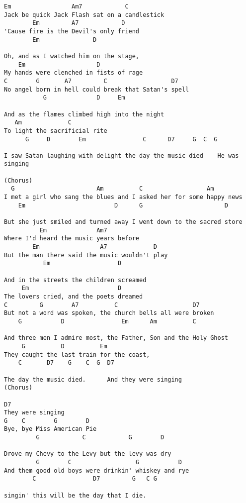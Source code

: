 \begin{verbatim}
Em                 Am7            C 
Jack be quick Jack Flash sat on a candlestick  
        Em         A7            D 
'Cause fire is the Devil's only friend 
        Em               D 

Oh, and as I watched him on the stage,  
    Em                    D 
My hands were clenched in fists of rage 
C        G       A7         C                  D7 
No angel born in hell could break that Satan's spell 
           G              D     Em 

And as the flames climbed high into the night  
   Am             C 
To light the sacrificial rite 
      G     D        Em                C      D7     G  C  G 

I saw Satan laughing with delight the day the music died    He was singing 

(Chorus) 
  G                       Am          C                  Am 
I met a girl who sang the blues and I asked her for some happy news 
    Em                         D      G                       D 

But she just smiled and turned away I went down to the sacred store 
          Em              Am7 
Where I'd heard the music years before  
        Em                 A7             D 
But the man there said the music wouldn't play 
           Em                   D 

And in the streets the children screamed  
     Em                         D 
The lovers cried, and the poets dreamed 
C         G        A7          C                     D7 
But not a word was spoken, the church bells all were broken 
    G           D                Em      Am          C 

And three men I admire most, the Father, Son and the Holy Ghost 
     G          D          Em 
They caught the last train for the coast, 
    C       D7    G    C  G  D7 

The day the music died.      And they were singing 
(Chorus) 

D7 
They were singing 
G    C        G        D 
Bye, bye Miss American Pie  
         G            C            G        D 

Drove my Chevy to the Levy but the levy was dry 
         G        C                  G           D 
And them good old boys were drinkin' whiskey and rye 
        C                D7         G   C G 

singin' this will be the day that I die.
\end{verbatim}
